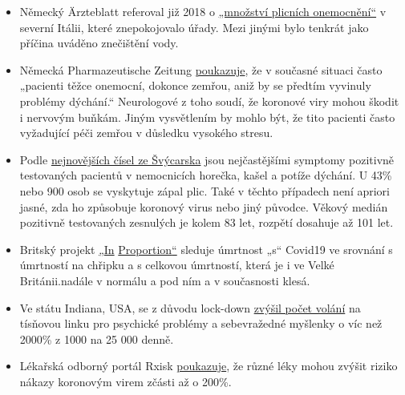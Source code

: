 \begin{itemize}
{  soudními lékaři}, aby počítal pouze „pravá`` úmrtí na koronu. Tím se
  počet úmrtí oproti údajům Institutu Roberta Kocha snížil až o 50\%.
\item
  Německý Ärzteblatt referoval již 2018 o
  \href{https://www.aerzteblatt.de/nachrichten/97750/Vielzahl-an-Lungenentzuendungen-beunruhigen-Behoerden-in-Norditalien}{„množství
  plicních onemocnění``} v severní Itálii, které znepokojovalo úřady.
  Mezi jinými bylo tenkrát jako příčina uváděno znečištění vody.
\item
  Německá Pharmazeutische Zeitung
  \href{https://www.pharmazeutische-zeitung.de/atemstillstand-koennte-auch-zentrale-ursache-haben-116664/}{poukazuje},
  že v současné situaci často „pacienti těžce onemocní, dokonce zemřou,
  aniž by se předtím vyvinuly problémy dýchání.`` Neurologové z toho
  soudí, že koronové viry mohou škodit i nervovým buňkám. Jiným
  vysvětlením by mohlo být, že tito pacienti často vyžadující péči
  zemřou v důsledku vysokého stresu.
\item
  Podle
  \href{https://www.bag.admin.ch/dam/bag/de/dokumente/mt/k-und-i/aktuelle-ausbrueche-pandemien/2019-nCoV/covid-19-lagebericht.pdf.download.pdf/COVID-19_Epidemiologische_Lage_Schweiz.pdf}{nejnovějších
  čísel ze Švýcarska} jsou nejčastějšími symptomy pozitivně testovaných
  pacientů v nemocnicích horečka, kašel a potíže dýchání. U 43\% nebo
  900 osob se vyskytuje zápal plic. Také v těchto případech není apriori
  jasné, zda ho způsobuje koronový virus nebo jiný původce. Věkový
  medián pozitivně testovaných zesnulých je kolem 83 let, rozpětí
  dosahuje až 101 let.
\item
  Britský projekt
  \href{http://inproportion2.talkigy.com/\%20/t\%20_blank}{„}\href{http://inproportion2.talkigy.com/\%20/t\%20_blank}{In}
  \href{http://inproportion2.talkigy.com/\%20/t\%20_blank}{Proportion}\href{http://inproportion2.talkigy.com/\%20/t\%20_blank}{``}
  sleduje úmrtnost „s`` Covid19 ve srovnání s úmrtností na chřipku a s
  celkovou úmrtností, která je i ve Velké Británii.nadále v normálu a
  pod ním a v současnosti klesá.
\item
  Ve státu Indiana, USA, se z důvodu lock-down
  \href{https://twitter.com/JesseKellyDC/status/1246449878219145216}{zvýšil
  počet volání} na tísňovou linku pro psychické problémy a sebevražedné
  myšlenky o víc než 2000\% z 1000 na 25 000 denně.
\item
  Lékařská odborný portál Rxisk
  \href{https://rxisk.org/medications-compromising-covid-infections/}{poukazuje},
  že různé léky mohou zvýšit riziko nákazy koronovým virem zčásti až o
  200\%.
\end{itemize}

